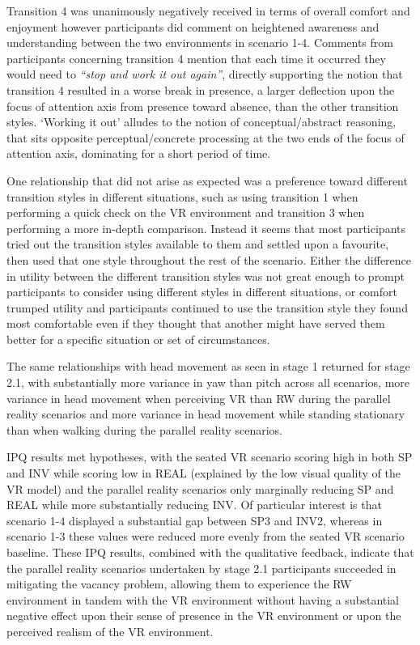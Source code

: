 Transition 4 was unanimously negatively received in terms of overall comfort and enjoyment however participants did comment on heightened awareness and understanding between the two environments in scenario 1-4. Comments from participants concerning transition 4 mention that each time it occurred they would need to \textit{``stop and work it out again''}, directly supporting the notion that transition 4 resulted in a worse break in presence, a larger deflection upon the focus of attention axis from presence toward absence, than the other transition styles. `Working it out' alludes to the notion of conceptual/abstract reasoning, that sits opposite perceptual/concrete processing at the two ends of the focus of attention axis, dominating for a short period of time.

One relationship that did not arise as expected was a preference toward different transition styles in different situations, such as using transition 1 when performing a quick check on the VR environment and transition 3 when performing a more in-depth comparison. Instead it seems that most participants tried out the transition styles available to them and settled upon a favourite, then used that one style throughout the rest of the scenario. Either the difference in utility between the different transition styles was not great enough to prompt participants to consider using different styles in different situations, or comfort trumped utility and participants continued to use the transition style they found most comfortable even if they thought that another might have served them better for a specific situation or set of circumstances.

The same relationships with head movement as seen in stage 1 returned for stage 2.1, with substantially more variance in yaw than pitch across all scenarios, more variance in head movement when perceiving VR than RW during the parallel reality scenarios and more variance in head movement while standing stationary than when walking during the parallel reality scenarios.

IPQ results met hypotheses, with the seated VR scenario scoring high in both SP and INV while scoring low in REAL (explained by the low visual quality of the VR model) and the parallel reality scenarios only marginally reducing SP and REAL while more substantially reducing INV. Of particular interest is that scenario 1-4 displayed a substantial gap between SP3 and INV2, whereas in scenario 1-3 these values were reduced more evenly from the seated VR scenario baseline. These IPQ results, combined with the qualitative feedback, indicate that the parallel reality scenarios undertaken by stage 2.1 participants succeeded in mitigating the vacancy problem, allowing them to experience the RW environment in tandem with the VR environment without having a substantial negative effect upon their sense of presence in the VR environment or upon the perceived realism of the VR environment.

